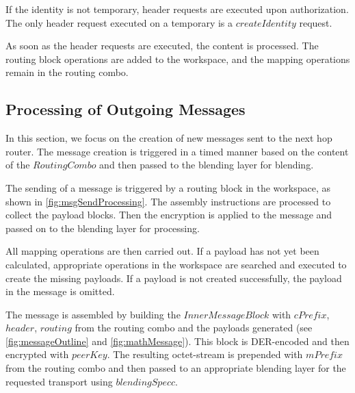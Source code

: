 If the identity is not temporary, header requests are executed upon authorization. The only header request executed on a temporary  is a $createIdentity$ request. 

\begin{figure*}[ht]\centering
	\resizebox{0.95\textwidth}{!}{}
	\caption{Flow diagram showing processing of outgoing messages.}
	\label{fig:msgReceiveProcessing}
\end{figure*}

As soon as the header requests are executed, the content is processed. The routing block operations are added to the workspace, and the mapping operations remain in the routing combo. 

\subsection{Processing of Outgoing Messages}\label{sec:processingOutgoingMessages}
In this section, we focus on the creation of new messages sent to the next hop router. The message creation is triggered in a timed manner based on the content of the $RoutingCombo$ and then passed to the blending layer for blending.

The sending of a message is triggered by a routing block in the workspace, as shown in \cref{fig:msgSendProcessing}. The assembly instructions are processed to collect the payload blocks. Then the encryption is applied to the message and passed on to the blending layer for processing.

\begin{figure*}[ht]\centering
	\resizebox{0.95\textwidth}{!}{}
	\caption{Flow diagram showing processing of outgoing messages.}
	\label{fig:msgSendProcessing}
\end{figure*}

All mapping operations are then carried out. If a payload has not yet been calculated, appropriate operations in the workspace are searched and executed to create the missing payloads. If a payload is not created successfully, the payload in the message is omitted. 

The message is assembled by building the $InnerMessageBlock$ with $cPrefix$, $header$, $routing$ from the routing combo and the payloads generated (see \cref{fig:messageOutline} and \cref{fig:mathMessage}). This block is DER-encoded and then encrypted with $peerKey$. The resulting octet-stream is prepended with $mPrefix$ from the routing combo and then passed to an appropriate blending layer for the requested transport using $blendingSpecc$.

